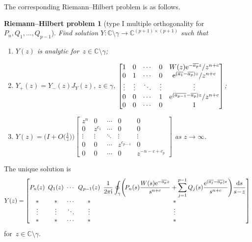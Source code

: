 \documentclass[pdftex]{sigma}
\numberwithin{equation}{section}
\newtheorem*{rhproblem}{Riemann--Hilbert problem}
{ \theoremstyle{definition}
 \newtheorem{Definition}[Theorem]{Definition}
 \newtheorem{Note}[Theorem]{Note}
 \newtheorem{Example}[Theorem]{Example}
 \newtheorem{Remark}[Theorem]{Remark}
}
\newcommand*{\Cset}{\mathbb{C}} %
\begin{document}
 The corresponding Riemann--Hilbert problem is as follows.
 \begin{rhproblem}[type I multiple orthogonality for~$P_n,Q_1,\dots,Q_{p-1}$]
 Find solution $Y\colon \Cset \setminus \gamma \to \Cset^{(p+1) \times (p+1)}$
 such that
 \begin{enumerate}
 \item[$(1)$] $Y(z)$ is analytic for~$z \in \Cset \setminus \gamma$;

 \item[$(2)$] $Y_+(z) = Y_-(z) J_Y(z)$, $z \in \gamma$,
$
 \begin{bmatrix}
 1 & 0&\cdots &0& W(z){\rm e}^{-\overline{a_p} z}/z^{n+c}\\
 0 & 1& \cdots &0& {\rm e}^{(\overline{a_1}-\overline{a_p}) z}/z^{n+c}\\
 \vdots & \vdots&\ddots&\vdots&\vdots\\
 0 & 0& \cdots &1& {\rm e}^{(\overline{a_{p-1}} -\overline{a_p})z}/z^{n+c}\\
 0&0&\cdots&0& 1
 \end{bmatrix}
$;

 \item[$(3)$] $Y(z) = \big(I + O\big(\frac{1}{z}\big)\big)
 \begin{bmatrix}
 z^n&0&\cdots&0&0\\
 0&z^{c_1}&\cdots& 0&0\\
 \vdots&\vdots& \ddots&\vdots&\vdots\\
 0&0&\cdots&z^{c_{p-1}}&0\\
 0&0&\cdots&0&z^{-n-c+c_{p}}
 \end{bmatrix}
 $ as $z \to \infty$.
 \end{enumerate}
 \end{rhproblem}	

 The unique solution is
 \begin{gather*}
\setlength{\arraycolsep}{2.5pt}
 Y(z)= \begin{bmatrix}
 P_n(z) & Q_1(z)&\cdots&Q_{p-1}(z)& \displaystyle \frac{1}{2 \pi {\rm i}} \oint_\gamma \! \Bigg(\!P_n(s) \frac{W(s){\rm e}^{-\overline{a_p}z}}{s^{n+c}} +
 \sum_{j=1}^{p-1} Q_j(s) \frac{{\rm e}^{(\overline{a_j} - \overline{a_p}) s}}{s^{n+c}}\Bigg) \frac{{\rm d}s}{s\!-\!z}\\
 * & * & \cdots &*&*\\
 \vdots & \vdots & \ddots & \vdots&\vdots\\
 * & * & \cdots &*&*
 \end{bmatrix}
 \end{gather*}
 for~$z \in \Cset \setminus \gamma$.
\end{document}
